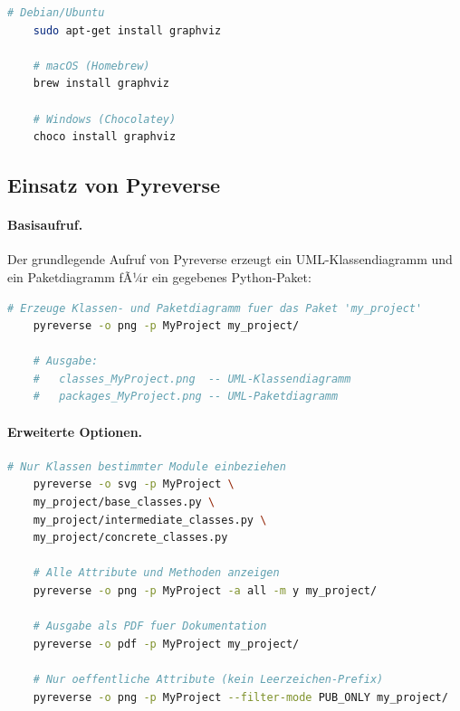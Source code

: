 ﻿\documentclass[a4paper,12pt]{article}
\begin{document}
\begin{lstlisting}[language=bash, caption={Installation von Graphviz},
	label={lst:graphviz}]
	# Debian/Ubuntu
	sudo apt-get install graphviz
	
	# macOS (Homebrew)
	brew install graphviz
	
	# Windows (Chocolatey)
	choco install graphviz
\end{lstlisting}

\subsection{Einsatz von Pyreverse}

\paragraph{Basisaufruf.}
Der grundlegende Aufruf von Pyreverse erzeugt ein UML-Klassendiagramm und ein
Paketdiagramm fÃ¼r ein gegebenes Python-Paket:

\begin{lstlisting}[language=bash, caption={Grundlegender Pyreverse-Aufruf},
	label={lst:pyreverse_basic}]
	# Erzeuge Klassen- und Paketdiagramm fuer das Paket 'my_project'
	pyreverse -o png -p MyProject my_project/
	
	# Ausgabe:
	#   classes_MyProject.png  -- UML-Klassendiagramm
	#   packages_MyProject.png -- UML-Paketdiagramm
\end{lstlisting}

\paragraph{Erweiterte Optionen.}

\begin{lstlisting}[language=bash, caption={Erweiterte Pyreverse-Optionen},
	label={lst:pyreverse_advanced}]
	# Nur Klassen bestimmter Module einbeziehen
	pyreverse -o svg -p MyProject \
	my_project/base_classes.py \
	my_project/intermediate_classes.py \
	my_project/concrete_classes.py
	
	# Alle Attribute und Methoden anzeigen
	pyreverse -o png -p MyProject -a all -m y my_project/
	
	# Ausgabe als PDF fuer Dokumentation
	pyreverse -o pdf -p MyProject my_project/
	
	# Nur oeffentliche Attribute (kein Leerzeichen-Prefix)
	pyreverse -o png -p MyProject --filter-mode PUB_ONLY my_project/
\end{lstlisting}
\end{document}
